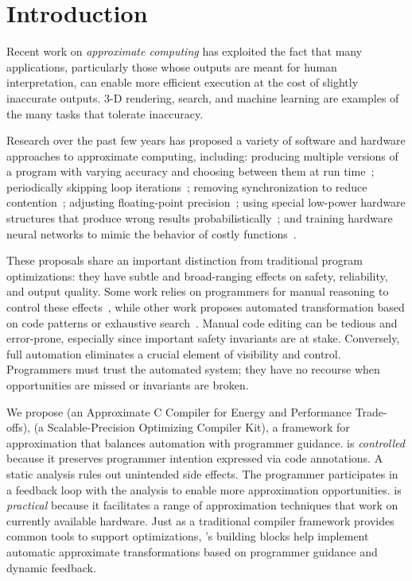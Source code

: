 \section{Introduction}\label{sec:intro}

%
Recent work on \emph{approximate computing} has exploited the fact that 
many applications, particularly those whose outputs are meant for human
interpretation, can enable more efficient execution at the cost of slightly
inaccurate outputs. 3-D rendering, search, and machine learning
are examples of the many tasks that tolerate inaccuracy.

Research over the past few years has proposed a variety of software and hardware 
approaches to approximate computing, including:
%
producing multiple versions of a program with varying accuracy and choosing
between them at run
time~\cite{green, dynamicknobs};
%
periodically skipping loop iterations~\cite{perforation, qosprof};
%
removing synchronization to reduce contention~\cite{dubstep, quickstep, races-ibm};
%
adjusting floating-point precision~\cite{precimonious};
%
using special low-power hardware
structures that produce wrong results probabilistically~\cite{truffle, flikker};
%
and training hardware neural networks to mimic the behavior of costly
functions~\cite{npu, anpu}.

These proposals share an important distinction
from traditional program optimizations:
they have subtle and broad-ranging effects on safety, reliability, and output
quality.
Some work relies on programmers for manual reasoning to control
these
effects~\cite{npu, flikker, races-ibm, perforation},
while other work proposes automated transformation based on code
patterns or exhaustive search~\cite{green, paraprox, sage}.
Manual code editing can be tedious and error-prone, especially since
important safety invariants are at stake.
Conversely, full automation eliminates a crucial element of
visibility and control.
Programmers must trust the automated system; they have no recourse when
opportunities are missed or invariants are broken.

We propose \sysname
\ifnum{}
(an Approximate C Compiler for Energy and Performance Trade-offs),
\else
(a Scalable-Precision Optimizing Compiler Kit),
\fi
a framework for approximation that balances automation with programmer
guidance.
\sysname is \emph{controlled} because it preserves programmer intention
expressed via code annotations.
A static analysis rules out
unintended side effects. The programmer participates in a feedback loop with
the analysis to enable more approximation
opportunities.
\sysname is \emph{practical} because it facilitates a range
of approximation techniques that work on currently available hardware.
Just as a traditional compiler framework provides common tools to support
optimizations,
\sysname's building blocks help implement automatic
approximate transformations based on programmer guidance and dynamic feedback.

